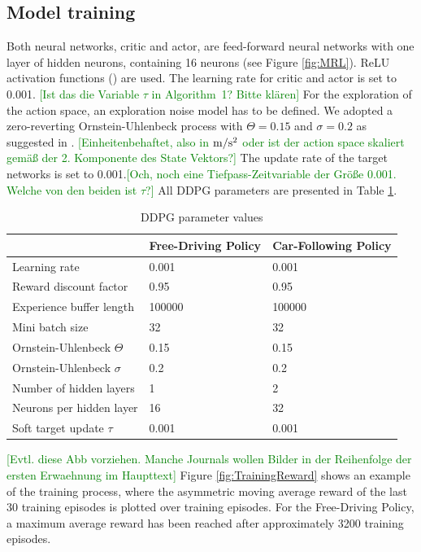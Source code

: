 \documentclass[review]{elsarticle}
\providecommand{\green}[1]{\textcolor{green}{#1}}
\providecommand{\martinc}[1]{\green{[#1]}} %
\providecommand{\3}{{\ss}}
\begin{document}
\subsection{Model training}
Both neural networks, critic and actor, are feed-forward neural
networks with one layer of hidden neurons, containing 16 neurons (see
Figure \ref{fig:MRL}). ReLU activation functions (\cite{relu}) are used. The learning rate for
critic and actor is set to 0.001. \martinc{Ist das die Variable $\tau$
  in Algorithm~1? Bitte kl\"aren} For the exploration of the action
space, an exploration noise model has to be defined. We adopted a
zero-reverting Ornstein-Uhlenbeck process with $\Theta = 0.15$  and
$\sigma = 0.2$ as suggested in
\cite{DDPG}. \martinc{Einheitenbehaftet, also in $\unit[]{m/s^2}$ oder
  ist der action space skaliert gem\"a\3 der 2. Komponente des State
  Vektors?} The update rate of the target networks is set to
0.001.\martinc{Och, noch eine Tiefpass-Zeitvariable der Gr\"o\3e
  0.001. Welche von den beiden ist $\tau$?}
All DDPG parameters are presented in Table \ref{tab:DDPGparameters}.
%
  \begin{table}
	\caption{DDPG parameter values} 
	\label{tab:DDPGparameters} 
	\begin{center}
		\begin{tabular}{ p{} p{}  p{} }
			 & Free-Driving Policy & Car-Following Policy \\ \hline
			Learning rate & 0.001 & 0.001\\ 
			Reward discount factor & 0.95 & 0.95 \\ 
			Experience buffer length & 100000 & 100000 \\ 
			Mini batch size & 32 & 32 \\ 			
			Ornstein-Uhlenbeck  $\Theta$ & 0.15& 0.15 \\ 
			Ornstein-Uhlenbeck  $\sigma$ & 0.2 & 0.2 \\ 
			Number of hidden layers & 1 & 2\\
			Neurons per hidden layer & 16 & 32\\
			Soft target update  $\tau$ & 0.001 & 0.001\\
			
			
		\end{tabular}
	\end{center}
\end{table}
%
\martinc{Evtl. diese Abb vorziehen. Manche Journals wollen Bilder in
  der Reihenfolge der ersten Erwaehnung im Haupttext}
Figure \ref{fig:TrainingReward} shows an example of the training
process, where the asymmetric moving average reward of the last 30 training episodes is plotted over training episodes. For the Free-Driving Policy, a maximum average reward has been reached after approximately 3200 training episodes.
\end{document}
